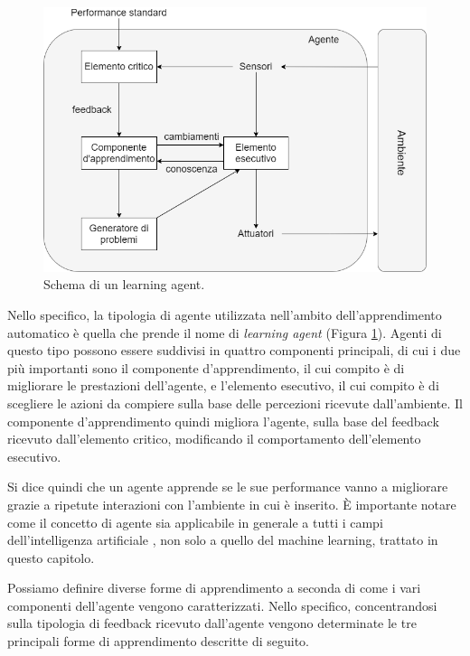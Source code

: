\documentclass[../../main.tex]{subfiles}
\begin{document}
    \begin{figure}[H]
        \centering
        \includegraphics[width =\textwidth]{immagini/4_0/learning_agent.png}
        \caption{Schema di un learning agent.}
        \label{fig:learning_agent}
    \end{figure}

    Nello specifico, la tipologia di agente utilizzata nell'ambito dell'apprendimento automatico è quella che prende il nome di \textit{learning agent} (Figura \ref{fig:learning_agent}). Agenti di questo tipo possono essere suddivisi in quattro componenti principali, di cui i due più importanti sono il componente d'apprendimento, il cui compito è di migliorare le prestazioni dell'agente, e l'elemento esecutivo, il cui compito è di scegliere le azioni da compiere sulla base delle percezioni ricevute dall'ambiente. Il componente d'apprendimento quindi migliora l'agente, sulla base del feedback ricevuto dall'elemento critico, modificando il comportamento dell'elemento esecutivo.

    Si dice quindi che un agente apprende se le sue performance vanno a migliorare grazie a ripetute interazioni con l'ambiente in cui è inserito.
    È importante notare come il concetto di agente sia applicabile in generale a tutti i campi dell'intelligenza artificiale \cite{russel2010}, non solo a quello del machine learning, trattato in questo capitolo.

    Possiamo definire diverse forme di apprendimento a seconda di come i vari componenti dell'agente vengono caratterizzati. Nello specifico, concentrandosi sulla tipologia di feedback ricevuto dall'agente vengono determinate le tre principali forme di apprendimento descritte di seguito.
    
\end{document}
